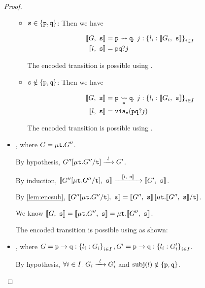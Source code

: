 \begin{proof}
\begin{itemize}
\begin{itemize}
\item $\mrole{s} \in \{ \mrole{p}, \mrole{q} \}$:
Then we have

\begin{align*}
\enc{G}{s} &= \gtrans{p}{q}{j}{l_i: \enc{G_i}{s}}{i \in I} \\
\enc{l}{s} &= \ain{p}{q}{j} \\
\end{align*}

The encoded transition is possible using .

\item $\mrole{s} \notin \{ \mrole{p}, \mrole{q} \}$:
Then we have

\begin{align*}
\enc{G}{s} &= \gtransroute{p}{q}{s}{j}{l_i: \enc{G_i}{s}}{i \in I} \\
\enc{l}{s} &= \via{s}{\ain{p}{q}{j}} \\
\end{align*}

The encoded transition is possible using .

\end{itemize}

\item {},
where $G = \trec{G''}$.

By hypothesis, $\treduce{G''[\trec{G''} / \trecvar]}{G'}{l}$.

By induction, $
\treducelong
	{\enc{G''[\trec{G''} / \trecvar]}{s}}
	{\enc{G'}{s}}
	{\enc{l}{s}}
$.

By \cref{lem:encsub}, 
$\enc{G''[\trec{G''} / \trecvar]}{s} 
= \enc{G''}{s}\left[ \trec{\enc{G''}{s}} / \trecvar \right]$.

We know $\enc{G}{s} = \enc{\trec{G''}}{s} = \trec{\enc{G''}{s}}$.

The encoded transition is possible using  as shown:

\begin{prooftree}
\end{prooftree}

\item {},
where $G = \gcomm{p}{q}{l_i: G_i}{i \in I},
G' = \gcomm{p}{q}{l_i: G'_i}{i \in I}$.

By hypothesis,
$\forall i \in I. ~ \treduce{G_i}{G'_i}{l}$
and $\subj{l} \notin \{ \mrole{p}, \mrole{q} \}$.


\end{itemize}
\end{proof}
